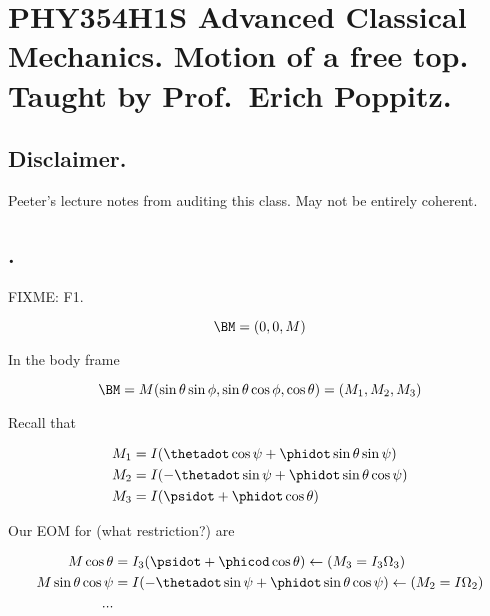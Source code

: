 
%

\chapter{PHY354H1S Advanced Classical Mechanics.  Motion of a free top.  Taught by Prof.\ Erich Poppitz.}
\label{chap:motionOfFreeTop}
{}
\date{Mar 28, 2012}

\beginArtWithToc

\section{Disclaimer.}

Peeter's lecture notes from auditing this class.  May not be entirely coherent.

\section{.}

FIXME: F1.

\begin{equation}\label{eqn:motionOfFreeTop:n}
\BM = (0, 0, M)
\end{equation}

In the body frame

\begin{equation}\label{eqn:motionOfFreeTop:n}
\BM = M ( \sin\theta \sin\phi, \sin\theta \cos\phi, \cos\theta ) = (M_1, M_2, M_3) 
\end{equation}

Recall that 

\begin{align}\label{eqn:motionOfFreeTop:n}
M_1 &= I (\thetadot \cos\psi + \phidot \sin\theta \sin\psi) \\
M_2 &= I (-\thetadot \sin\psi + \phidot \sin\theta \cos\psi) \\
M_3 &= I (\psidot + \phidot \cos\theta)
\end{align}

Our EOM for (what restriction?) are

\begin{align}\label{eqn:motionOfFreeTop:n}
M \cos\theta &= I_3 ( \psidot + \phicod \cos\theta ) \leftarrow ( M_3 = I_3 \Omega_3) \\
M \sin\theta \cos\psi &= I ( -\thetadot \sin\psi + \phidot \sin\theta \cos\psi)  \leftarrow (M_2 = I \Omega_2) \\
...
\end{align}

